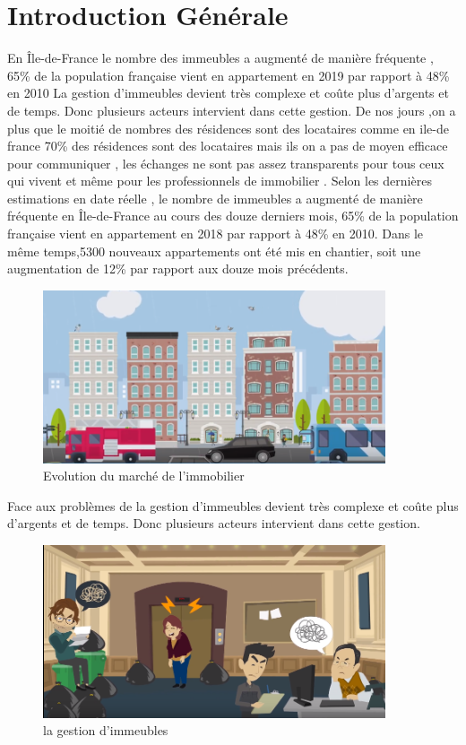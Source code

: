 \documentclass[a4paper,10pt]{book}
\begin{document}
\tableofcontents
\listoffigures

\newpage
\section*{Introduction G\'en\'erale} 
\par En Île-de-France le nombre des immeubles a augmenté de manière fréquente , 65\% \cite{einstein} de la population française vient en appartement en 2019 par rapport à 48\% en 2010​
La gestion d'immeubles devient très complexe et coûte plus d'argents et de temps.
Donc plusieurs acteurs intervient dans cette gestion.
De nos jours ,on a plus que le moitié de nombres des résidences sont des locataires comme en ile-de france 70\% des résidences sont des locataires  mais ils on a pas de moyen efficace pour communiquer , les échanges ne sont pas assez transparents pour tous ceux qui vivent et même pour les professionnels de immobilier . Selon les dernières estimations en date réelle  \cite{einstein} , le nombre de immeubles a augmenté de manière fréquente en Île-de-France au cours des douze derniers mois, 65\% de la population française vient en appartement en 2018 par rapport à 48\% en 2010.
Dans le même temps,5300 nouveaux appartements ont été mis en chantier, soit une augmentation de 12\% par rapport aux douze mois précédents.
 \begin{figure}[!h]
  \centering 
\includegraphics[width=0.9\textwidth]{imm.PNG}
\caption{Evolution du marché de l'immobilier}
\label{fig4}
\end{figure}

 Face aux problèmes de la gestion d'immeubles devient très complexe et coûte plus d'argents et de temps.
Donc plusieurs acteurs intervient dans cette gestion.

 \begin{figure}[!h]
  \centering 
\includegraphics[width=0.9\textwidth]{problemeHL.PNG}
\caption{la gestion d'immeubles}
\label{fig4}
\end{figure}
\renewcommand{\thesection}{\thechapter.\arabic{section}}
\end{document}
